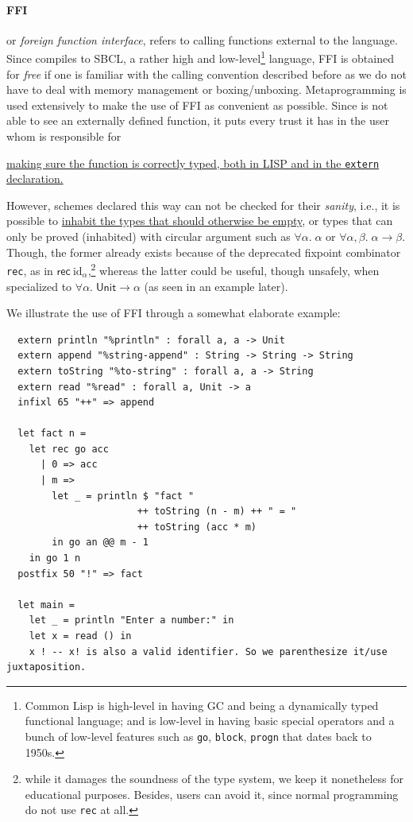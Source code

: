 \documentclass[a4paper, 11pt]{article}
\theoremstyle{remark}\newtheorem*{remark}{Remark}
\theoremstyle{definition}\newtheorem*{definition}{Definition}
\begin{document}
\paragraph{FFI} or \emph{foreign function interface}, refers to calling functions external to the language.
Since \Tigris compiles to SBCL, a rather high and low-level\footnote{
Common Lisp is high-level in having GC and being a dynamically typed functional language;
and is low-level in having basic special operators and a bunch of low-level features such as
\texttt{go}, \texttt{block}, \texttt{progn} that
dates back to 1950s.
}
language, FFI is obtained for \emph{free} if one is familiar with the calling convention
described before as we do not have to deal with memory management or boxing/unboxing.
Metaprogramming is used extensively
to make the use of FFI as convenient as possible.
Since \Tigris is not able to see an externally defined function, it
puts every trust it has in the user whom is responsible for
\begin{center}\underline{making sure the function is correctly typed,
both in LISP and in the \texttt{extern} declaration.}
\end{center}

However, schemes declared this way can not be checked for their \emph{sanity}, i.e.,
it is possible to \underline{inhabit the types that should otherwise be empty},
or types that can only be proved (inhabited) with circular argument such as
$\forall\alpha.\;\alpha$ or $\forall\alpha,\beta.\;\alpha\to\beta$. Though, the former
already exists because of the deprecated fixpoint combinator \texttt{rec}, as in $\mathsf{rec}\ \mathrm{id}_\alpha$,\footnote{
while it damages the soundness of the type system, we keep it nonetheless for educational
purposes. Besides, users can avoid it, since normal programming do not use \texttt{rec} at all.
}
whereas the latter could be useful, though unsafely, when specialized
to $\forall\alpha.\;\mathsf{Unit}\to\alpha$ (as seen in an example later).

We illustrate the use of FFI through a somewhat elaborate example:

\begin{verbatim}
  extern println "%println" : forall a, a -> Unit
  extern append "%string-append" : String -> String -> String
  extern toString "%to-string" : forall a, a -> String
  extern read "%read" : forall a, Unit -> a
  infixl 65 "++" => append

  let fact n =
    let rec go acc
      | 0 => acc
      | m =>
        let _ = println $ "fact "
                       ++ toString (n - m) ++ " = "
                       ++ toString (acc * m)
        in go an @@ m - 1
    in go 1 n
  postfix 50 "!" => fact

  let main =
    let _ = println "Enter a number:" in
    let x = read () in
    x ! -- x! is also a valid identifier. So we parenthesize it/use juxtaposition.
\end{verbatim}
\end{document}
